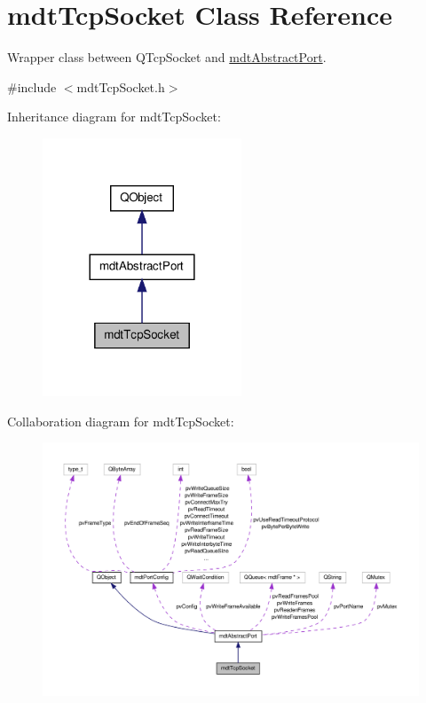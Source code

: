 \hypertarget{classmdt_tcp_socket}{\section{mdt\-Tcp\-Socket Class Reference}
\label{classmdt_tcp_socket}
}


Wrapper class between Q\-Tcp\-Socket and \hyperlink{classmdt_abstract_port}{mdt\-Abstract\-Port}.  




{\ttfamily \#include $<$mdt\-Tcp\-Socket.\-h$>$}



Inheritance diagram for mdt\-Tcp\-Socket\-:\nopagebreak
\begin{figure}[H]
\begin{center}
\leavevmode
\includegraphics[width=168pt]{classmdt_tcp_socket__inherit__graph}
\end{center}
\end{figure}


Collaboration diagram for mdt\-Tcp\-Socket\-:\nopagebreak
\begin{figure}[H]
\begin{center}
\leavevmode
\includegraphics[width=350pt]{classmdt_tcp_socket__coll__graph}
\end{center}
\end{figure}
